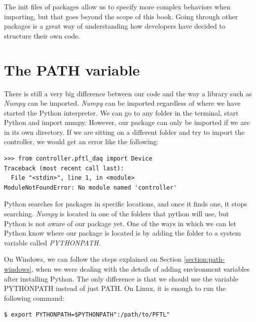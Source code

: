 
The init files of packages allow us to specify more complex behaviors when importing, but that goes beyond the scope of this book. Going through other packages is a great way of understanding how developers have decided to structure their own code.

\section{The PATH variable}\label{section:path}
There is still a very big difference between our code and the way a library such as \emph{Numpy} can be imported. \emph{Numpy} can be imported regardless of where we have started the Python interpreter. We can go to any folder in the terminal, start Python and import numpy. However, our package can only be imported if we are in its own directory. If we are sitting on a different folder and try to import the controller, we would get an error like the following:

\begin{verbatim}
>>> from controller.pftl_daq import Device
Traceback (most recent call last):
  File "<stdin>", line 1, in <module>
ModuleNotFoundError: No module named 'controller'
\end{verbatim}

Python searches for packages in specific locations, and once it finds one, it stops searching. \emph{Numpy} is located in one of the folders that python will use, but Python is not aware of our package yet. One of the ways in which we can let Python know where our package is located is by adding the folder to a system variable called \emph{PYTHONPATH}.

On Windows, we can follow the steps explained on Section \ref{section:path-windows}, when we were dealing with the details of adding environment variables after installing Python. The only difference is that we should use the variable PYTHONPATH instead of just PATH. On Linux, it is enough to run the following command:

\begin{verbatim}
$ export PYTHONPATH=$PYTHONPATH":/path/to/PFTL"
\end{verbatim}

